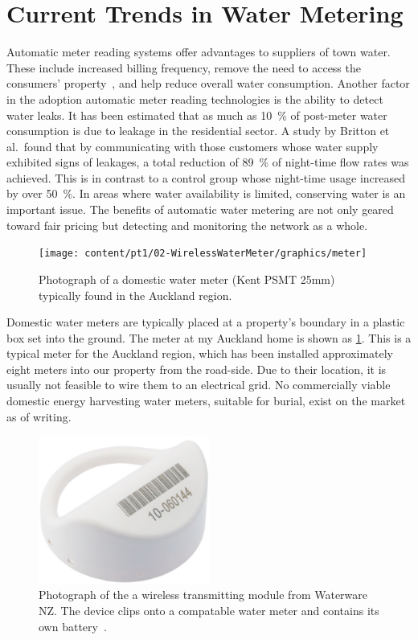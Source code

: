 \section{Current Trends in Water Metering}
  Automatic meter reading systems offer advantages to suppliers of town water.
  These include increased billing frequency, remove the need to access the consumers' property~\cite{Chang2012}, and help reduce overall water consumption.
  Another factor in the adoption automatic meter reading technologies is the ability to detect water leaks.
  It has been estimated that as much as \SI{10}{\percent} of post-meter water consumption is due to leakage in the residential sector.
  A study by Britton et al.\ found that by communicating with those customers whose water supply exhibited signs of leakages, a total reduction of  \SI{89}{\percent} of night-time flow rates was achieved.
  This is in contrast to a control group whose night-time usage increased by over \SI{50}{\percent}.
  In areas where water availability is limited, conserving water is an important issue.
  The benefits of automatic water metering are not only geared toward fair pricing but detecting and monitoring the network as a whole.

  \begin{figure}
    \centering
    \texttt{[image: content/pt1/02-WirelessWaterMeter/graphics/meter]}
    \caption{\label{fig:Photo_DomesticWaterMeter}Photograph of a domestic water meter (Kent PSMT 25mm) typically found in the Auckland region.}
  \end{figure}

  Domestic water meters are typically placed at a property's boundary in a plastic box set into the ground.
  The meter at my Auckland home is shown as \cref{fig:Photo_DomesticWaterMeter}.
  This is a typical meter for the Auckland region, which has been installed approximately eight meters into our property from the road-side.
  Due to their location, it is usually not feasible to wire them to an electrical grid.
  No commercially viable domestic energy harvesting water meters, suitable for burial, exist on the market as of writing.

  \begin{figure}
    \centering
    \includegraphics[width=0.5\textwidth]{content/pt1/02-WirelessWaterMeter/graphics/hydro-WMBUSWLESSM}
    \caption{\label{fig:Photo_waterwareMeter}Photograph of the a wireless transmitting module from Waterware NZ. The device clips onto a compatable water meter and contains its own battery~\cite{BMeters2014}.}
  \end{figure}

